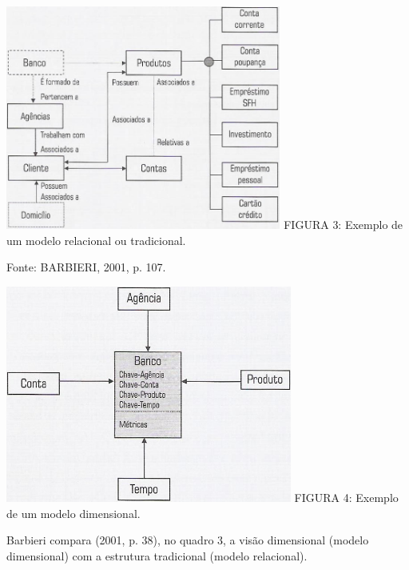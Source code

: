 \documentclass[a4paper]{article}
\begin{document}
{
 \includegraphics[width=9.063cm,height=7.359cm]{monograph-img002.jpg} \textsf{\MakeUppercase{ \newline
FIGURA }}\textsf{3: Exemplo de um modelo relacional ou tradicional.}}

{\sffamily
Fonte: BARBIERI, 2001, p. 107.}

{
 \includegraphics[width=9.417cm,height=7.121cm]{monograph-img003.jpg} \textsf{\MakeUppercase{\newline
FIGURA }}\textsf{4: Exemplo de um modelo dimensional.}}


\bigskip

{\sffamily
Barbieri compara (2001, p. 38), no quadro 3, a vis\~ao dimensional (modelo dimensional) com a estrutura tradicional
(modelo relacional).}


\bigskip
\end{document}
